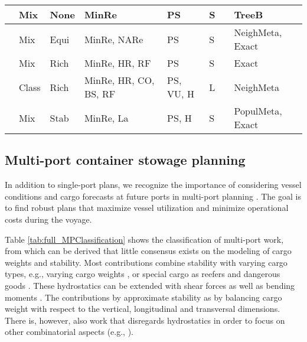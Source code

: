 \documentclass[preprint,12pt,authoryear]{elsarticle}
\begin{document}
\begin{table}[h!]
{\begin{tabular}{llllllll}
\cite{Zhao2018ContainerSearch}       & Mix            & None                  & MinRe                 & PS           & S           &             & TreeB                  \\ 
\hline
\cite{Li2020OptimizingShipping}         & Mix            & Equi            & MinRe, NARe                 & PS           & S           &           & NeighMeta, Exact                 \\ 
\hline
\cite{Zhu2020IntegerProblem}        & Mix            & Rich                  & MinRe, HR, RF         & PS           & S           &             & Exact                  \\ 
\hline
\cite{Larsen2021AProblem}     & Class          & Rich                  & MinRe, HR, CO, BS, RF & PS, VU, H    & L           &             & NeighMeta                 \\ 
\hline
\cite{ElYaagoubi2022Multi-objectiveSystem} & Mix            & Stab             & MinRe, La             & PS, H        & S           &             & PopulMeta, Exact          \\
\hline
\end{tabular}
}
\end{table}

\subsection{Multi-port container stowage planning}\label{sec:solMethods2}
In addition to single-port plans, we recognize the importance of considering vessel conditions and cargo forecasts at future ports in multi-port planning \citep{Delgado2012ABays}. The goal is to find robust plans that maximize vessel utilization and minimize operational costs during the voyage.

Table \ref{tab:full_MPClassification} shows the classification of multi-port work, from which can be derived that little consensus exists on the modeling of cargo weights and stability. 
Most contributions combine stability with varying cargo types, e.g., varying cargo weights \citep{ Liu2011RandomizedPlans, Hu2017Multi-objectiveRoute, Parreno-Torres2021SolvingAlgorithm}, or special cargo as reefers and dangerous goods \citep{Hamedi2011CONTAINERSHIPOPERATIONS, Liu2011RandomizedPlans, Chang2022SolvingMode}. These hydrostatics can be extended with shear forces \citep{Shields1984, Pacino2011FastVessels} as well as bending moments \citep{Botter1992StowageSolution}.
The contributions by \cite{Kaisar2006ATRANSPORTATION, Azevedo2014SolvingMeta-heuristics, Azevedo2018SolvingAlgorithm, Li2018Multi-PortUncertainties} approximate stability as \cite{Ambrosino2004StowingProblem} by balancing cargo weight with respect to the vertical, longitudinal and transversal dimensions.
There is, however, also work that disregards hydrostatics in order to focus on other combinatorial aspects (e.g., \cite{Avriel1998StowageShifts, Wilson2000ContainerSolutions, Pacino2018CranePlanning}).
\end{document}
